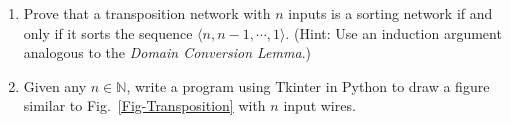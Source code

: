 \documentclass[12pt,a4paper]{article}
\makeatletter
\newtheorem*{solution}{Solution}
\theoremstyle{definition}
\renewenvironment{solution}[1][Solution] {\par\pushQED{\qed}\normalfont\topsep6\p@\@plus6\p@\relax\trivlist\item[\hskip\labelsep\bfseries#1\@addpunct{.}]\ignorespaces}{\popQED\endtrivlist\@endpefalse} \makeatother
\makeatother
\begin{document}
\begin{enumerate}
\begin{enumerate}
\item Prove that a transposition network with $n$ inputs is a sorting network if and only if it sorts the sequence $\langle n, n-1, \cdots, 1 \rangle$. {\color{blue}(Hint: Use an induction argument analogous to the \emph{Domain Conversion Lemma}.)}
\item {\color{red}{(Optional Sub-question with Bonus)}} Given any $n \in \mathbb{N}$, write a program using Tkinter in Python to draw a figure similar to Fig.~\ref{Fig-Transposition} with $n$ input wires.
\end{enumerate}
\end{enumerate}
\end{document}
